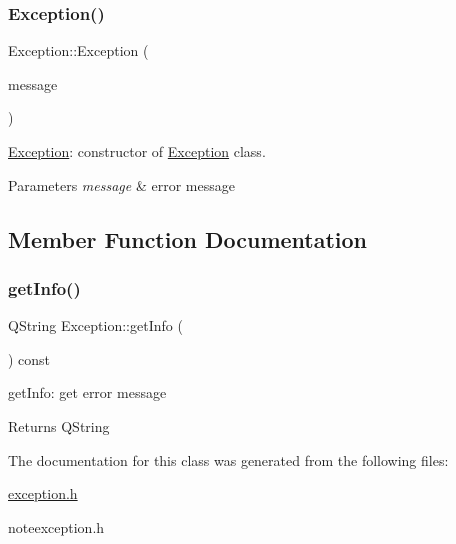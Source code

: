 \subsubsection{\texorpdfstring{Exception()}{Exception()}}
{\footnotesize\ttfamily Exception\+::\+Exception (\begin{DoxyParamCaption}\item[{const Q\+String \&}]{message }\end{DoxyParamCaption})\hspace{0.3cm}{\ttfamily [inline]}}



\hyperlink{class_exception}{Exception}\+: constructor of \hyperlink{class_exception}{Exception} class. 


\begin{DoxyParams}{Parameters}
{\em message} & error message \\
\hline
\end{DoxyParams}


\subsection{Member Function Documentation}
\mbox{\label{class_exception_af29b1b72e34afe4a37c676200f37950b}} 
\subsubsection{\texorpdfstring{get\+Info()}{getInfo()}}
{\footnotesize\ttfamily Q\+String Exception\+::get\+Info (\begin{DoxyParamCaption}{ }\end{DoxyParamCaption}) const\hspace{0.3cm}{\ttfamily [inline]}}



get\+Info\+: get error message 

\begin{DoxyReturn}{Returns}
Q\+String 
\end{DoxyReturn}


The documentation for this class was generated from the following files\+:\begin{DoxyCompactItemize}
\item 
\hyperlink{exception_8h}{exception.\+h}\item 
noteexception.\+h\end{DoxyCompactItemize}
